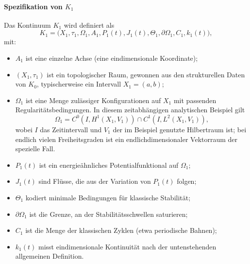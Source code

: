 \paragraph{Spezifikation von \texorpdfstring{\(K_1\)}{K\_1}}
Das Kontinuum \(K_1\) wird definiert als
\[
    K_1 = \big(X_1,\tau_1,\Omega_1,A_1,P_1(t),J_1(t),\Theta_1,\partial\Omega_1,C_1,k_1(t)\big),
\]
mit:
\begin{itemize}
    \item \(A_1\) ist eine einzelne Achse (eine eindimensionale Koordinate);
    \item \((X_1,\tau_1)\) ist ein topologischer Raum, gewonnen aus den
          strukturellen Daten von \(K_0\), typischerweise ein Intervall
          \(X_1 = (a,b)\);
    \item \(\Omega_1\) ist eine Menge zulässiger Konfigurationen auf \(X_1\)
          mit passenden Regularitätsbedingungen.
          In diesem zeitabhängigen analytischen Beispiel gilt
          \[
              \Omega_1 = C^0(I,H^1(X_1,V_1)) \cap C^1(I,L^2(X_1,V_1)),
          \]
          wobei \(I\) das Zeitintervall und \(V_1\) der im Beispiel genutzte
          Hilbertraum ist; bei endlich vielen Freiheitsgraden ist ein
          endlichdimensionaler Vektorraum der spezielle Fall.
    \item \(P_1(t)\) ist ein energieähnliches Potentialfunktional auf
          \(\Omega_1\);
    \item \(J_1(t)\) sind Flüsse, die aus der Variation von \(P_1(t)\) folgen;
    \item \(\Theta_1\) kodiert minimale Bedingungen für klassische Stabilität;
    \item \(\partial\Omega_1\) ist die Grenze, an der Stabilitätsschwellen
          saturieren;
    \item \(C_1\) ist die Menge der klassischen Zyklen (etwa periodische Bahnen);
    \item \(k_1(t)\) misst eindimensionale Kontinuität nach der untenstehenden
          allgemeinen Definition.
\end{itemize}

